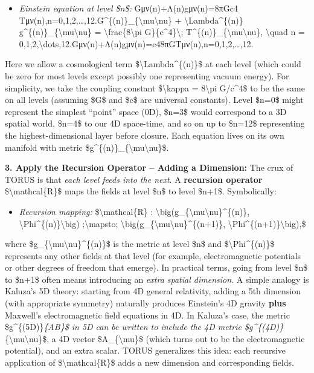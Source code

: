 \begin{itemize}
\item
  \emph{Einstein equation at level \$n\$:}
  Gμν(n)+Λ(n)gμν(n)=8πGc4  Tμν(n),n=0,1,2,\ldots{},12.G\^{}\{(n)\}\_\{\textbackslash{}mu\textbackslash{}nu\}
  + \textbackslash{}Lambda\^{}\{(n)\}
  g\^{}\{(n)\}\_\{\textbackslash{}mu\textbackslash{}nu\} =
  \textbackslash{}frac\{8\textbackslash{}pi
  G\}\{c\^{}4\}\textbackslash{};
  T\^{}\{(n)\}\_\{\textbackslash{}mu\textbackslash{}nu\},
  \textbackslash{}quad n =
  0,1,2,\textbackslash{}dots,12.Gμν(n)​+Λ(n)gμν(n)​=c48πG​Tμν(n)​,n=0,1,2,\ldots{},12.
\end{itemize}

Here we allow a cosmological term \$\textbackslash{}Lambda\^{}\{(n)\}\$
at each level (which could be zero for most levels except possibly one
representing vacuum energy). For simplicity, we take the coupling
constant \$\textbackslash{}kappa = 8\textbackslash{}pi G/c\^{}4\$ to be
the same on all levels (assuming \$G\$ and \$c\$ are universal
constants)​. Level \$n=0\$ might represent the simplest ``point'' space
(0D), \$n=3\$ would correspond to a 3D spatial world, \$n=4\$ to our 4D
space-time, and so on up to \$n=12\$ representing the
highest-dimensional layer before closure. Each equation lives on its own
manifold with metric
\$g\^{}\{(n)\}\_\{\textbackslash{}mu\textbackslash{}nu\}\$.

\textbf{3. Apply the Recursion Operator -- Adding a Dimension:} The crux
of TORUS is that \emph{each level feeds into the next}. A
\textbf{recursion operator} \$\textbackslash{}mathcal\{R\}\$ maps the
fields at level \$n\$ to level \$n+1\$. Symbolically​:

\begin{itemize}
\item
  \emph{Recursion mapping:} \$\textbackslash{}mathcal\{R\} :
  \textbackslash{}big(g\_\{\textbackslash{}mu\textbackslash{}nu\}\^{}\{(n)\},
  \textbackslash{}Phi\^{}\{(n)\}\textbackslash{}big)
  ;\textbackslash{}mapsto;
  \textbackslash{}big(g\_\{\textbackslash{}mu\textbackslash{}nu\}\^{}\{(n+1)\},
  \textbackslash{}Phi\^{}\{(n+1)\}\textbackslash{}big),\$
\end{itemize}

where \$g\_\{\textbackslash{}mu\textbackslash{}nu\}\^{}\{(n)\}\$ is the
metric at level \$n\$ and \$\textbackslash{}Phi\^{}\{(n)\}\$ represents
any other fields at that level (for example, electromagnetic potentials
or other degrees of freedom that emerge). In practical terms, going from
level \$n\$ to \$n+1\$ often means introducing an \emph{extra spatial
dimension}. A simple analogy is Kaluza's 5D theory: starting from 4D
general relativity, adding a 5th dimension (with appropriate symmetry)
naturally produces Einstein's 4D gravity \textbf{plus} Maxwell's
electromagnetic field equations in 4D​. In Kaluza's case, the metric
\$g\^{}\{(5D)\}\emph{\{AB\}\$ in 5D can be written to include the 4D
metric \$g\^{}\{(4D)\}}\{\textbackslash{}mu\textbackslash{}nu\}\$, a 4D
vector \$A\_\{\textbackslash{}mu\}\$ (which turns out to be the
electromagnetic potential), and an extra scalar. TORUS generalizes this
idea: each recursive application of \$\textbackslash{}mathcal\{R\}\$
adds a new dimension and corresponding fields.

